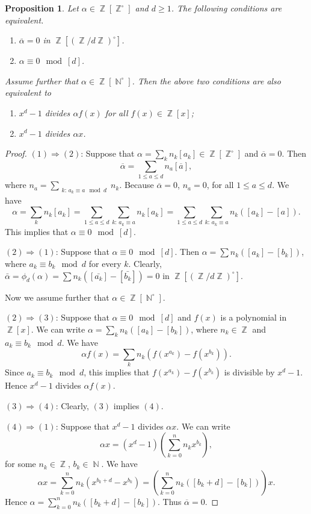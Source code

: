 \documentclass[12t,a4paper]{amsart}
\newtheorem{prop}[thm]{Proposition}
\theoremstyle{definition}
\DeclareMathOperator{\Z}{\mathbb{Z}}
\DeclareMathOperator{\N}{\mathbb{N}}
\numberwithin{equation}{section}
\begin{document}
{\begin{prop}
\label{prop:0modm}
    Let $\alpha\in \Z[\Z^\circ]$ and $d\geq 1$. The following conditions are equivalent.
    \begin{enumerate}
    \item $\overline{\alpha}=0$ in $\Z[(\Z/d\Z)^\circ]$.
        \item $\alpha\equiv 0\mod [d]$.
\end{enumerate}
Assume further that $\alpha\in \Z[\N^\circ]$. Then the above two conditions are also equivalent to 
\begin{enumerate}
        \item[(3)] $x^d-1$ divides $\alpha f(x)$ for all $f(x)\in \Z[x]$;
        \item[(4)] $x^d-1$ divides $\alpha x$.
    \end{enumerate}
\end{prop}
\begin{proof}
 $(1)\Rightarrow (2)$: Suppose that $\alpha =\sum\limits_k n_k[a_k]\in \Z[\Z^\circ]$ and $\overline{\alpha}=0$.
Then 
\[
\overline{\alpha}=\sum_{1\leq a\leq d} n_a [\overline{a}],
\]
 where $n_a=\sum\limits_{\substack{k:\, a_k\equiv a\mod d}} n_k$. Because $\overline{\alpha}=0$, $n_a=0$, for all $1\leq a\leq d$. We have
 \[
 \alpha= \sum\limits_k n_k[a_k] =\sum_{1\leq a\leq d }\sum\limits_{k:\,a_k\equiv a} n_k[a_k]=\sum_{1\leq a\leq d }\sum\limits_{k:\,a_k\equiv a} n_k([a_k]-[a]).
 \]
This implies that $\alpha\equiv 0\mod {[d]}$.

 $(2)\Rightarrow (1)$: Suppose that $\alpha\equiv 0\mod [d]$. Then $\alpha=\sum n_k([a_k]-[b_k])$, where $a_k\equiv b_k\mod d$ for every $k$. Clearly, $\bar{\alpha}=\phi_d(\alpha)=\sum n_k([\bar{a_k}]-[\bar{b_k}])=0$ in $\Z[(\Z/d\Z)^\circ]$.

Now we assume further that $\alpha\in \Z[\N^\circ]$.

\medskip
    $(2)\Rightarrow (3)$: Suppose that $\alpha\equiv 0\mod [d]$ and $f(x)$ is a polynomial in $\Z[x]$. We can write $\alpha =\sum_{k} n_k([a_k]-[b_k])$, where $n_k\in \Z$ and $a_k\equiv b_k\mod d$. We have
    \[
    \alpha f(x)=\sum_k n_k (f(x^{a_k})-f(x^{b_k})).
    \]
    Since $a_k\equiv b_k\mod d$, this implies that $f(x^{a_k})-f(x^{b_k})$ is divisible by $x^d-1$. Hence $x^d-1$ divides $\alpha f(x)$.

    \medskip
\noindent      $(3)\Rightarrow (4)$: Clearly, $(3)$ implies $(4)$.

\medskip
    \noindent $(4)\Rightarrow (1)$: Suppose that $x^d-1$ divides $\alpha x$. We can write
    \[
    \alpha x= (x^d-1)(\sum_{k=0}^n n_k x^{b_k}),
    \]
    for some $n_k\in \Z$, $b_k\in \N$. We have
    \[
     \alpha x =  \sum_{k=0}^n n_k (x^{b_k+d}-x^{b_k}) =\left( \sum_{k=0}^n n_k ([b_k+d]-[b_k])\right ) x.
    \]
    Hence $\alpha=\sum_{k=0}^n n_k ([b_k+d]-[b_k])$. Thus $\overline{\alpha}=0$.
\end{proof} 

}
\end{document}
